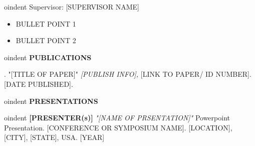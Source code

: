 \documentclass[12pt]{article}
\begin{document}
oindent Supervisor: [SUPERVISOR NAME]

\vspace{6pt}
\begin{itemize} \itemsep -2pt %
	\item BULLET POINT 1
	\item BULLET POINT 2
\end{itemize}

\vspace{0.2in} %


\begin{center}
	{
oindent \bfseries PUBLICATIONS}
\end{center}

\vspace{8pt} %

. "[TITLE OF PAPER]" {\itshape [PUBLISH INFO],} [LINK TO PAPER/ ID NUMBER]. [DATE PUBLISHED].  \\


\vspace{0.2in} %


\begin{center}
	{
oindent \bfseries PRESENTATIONS}
\end{center}

\vspace{8pt} %


oindent
{\bfseries [PRESENTER(s)]} {\itshape "[NAME OF PRSENTATION]"} Powerpoint Presentation. [CONFERENCE OR SYMPOSIUM NAME]. [LOCATION], [CITY], [STATE], USA. [YEAR]\\


\vspace{0.2in} %


\end{document}
